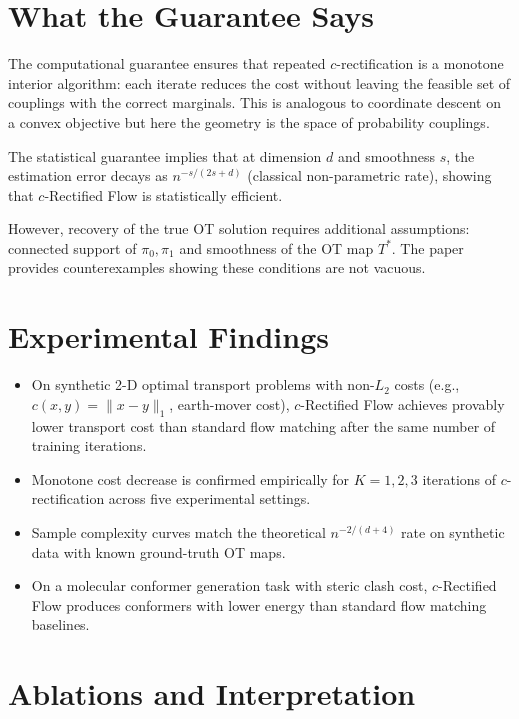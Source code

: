 \documentclass[10pt,twocolumn]{article}
\begin{document}
\section{What the Guarantee Says}

The computational guarantee ensures that repeated $c$-rectification is a
monotone interior algorithm: each iterate reduces the cost without leaving
the feasible set of couplings with the correct marginals. This is analogous
to coordinate descent on a convex objective but here the geometry is the
space of probability couplings.

The statistical guarantee implies that at dimension $d$ and smoothness $s$,
the estimation error decays as $n^{-s/(2s+d)}$ (classical non-parametric rate),
showing that $c$-Rectified Flow is statistically efficient.

However, recovery of the true OT solution requires additional assumptions:
connected support of $\pi_0, \pi_1$ and smoothness of the OT map $T^*$.
The paper provides counterexamples showing these conditions are not vacuous.

\section{Experimental Findings}

\begin{itemize}[itemsep=2pt,parsep=0pt]
  \item On synthetic 2-D optimal transport problems with non-$L_2$ costs
    (e.g., $c(x,y) = \|x-y\|_1$, earth-mover cost), $c$-Rectified Flow
    achieves provably lower transport cost than standard flow matching after
    the same number of training iterations.
  \item Monotone cost decrease is confirmed empirically for $K = 1, 2, 3$
    iterations of $c$-rectification across five experimental settings.
  \item Sample complexity curves match the theoretical $n^{-2/(d+4)}$ rate
    on synthetic data with known ground-truth OT maps.
  \item On a molecular conformer generation task with steric clash cost,
    $c$-Rectified Flow produces conformers with lower energy than standard
    flow matching baselines.
\end{itemize}

\section{Ablations and Interpretation}
\end{document}
